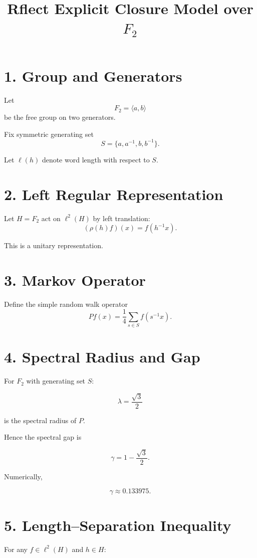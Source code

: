 \documentclass[11pt]{article}
\title{Rflect Explicit Closure Model over $F_2$}
\author{}
\date{}
\begin{document}
\maketitle

\section*{1. Group and Generators}

Let
\[
F_2 = \langle a,b \rangle
\]
be the free group on two generators.

Fix symmetric generating set
\[
S = \{a,a^{-1},b,b^{-1}\}.
\]

Let $\ell(h)$ denote word length with respect to $S$.

\section*{2. Left Regular Representation}

Let $H = F_2$ act on $\ell^2(H)$ by left translation:
\[
(\rho(h)f)(x) = f(h^{-1}x).
\]

This is a unitary representation.

\section*{3. Markov Operator}

Define the simple random walk operator
\[
Pf(x) = \frac{1}{4}\sum_{s \in S} f(s^{-1}x).
\]

\section*{4. Spectral Radius and Gap}

For $F_2$ with generating set $S$:

\[
\lambda = \frac{\sqrt{3}}{2}
\]

is the spectral radius of $P$.

Hence the spectral gap is

\[
\gamma = 1 - \frac{\sqrt{3}}{2}.
\]

Numerically,

\[
\gamma \approx 0.133975.
\]

\section*{5. Length--Separation Inequality}

For any $f \in \ell^2(H)$ and $h \in H$:
\end{document}
